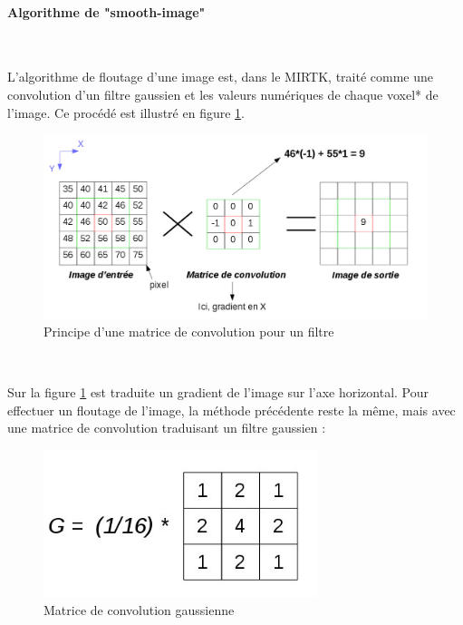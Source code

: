 \documentclass[10pt]{report}
\begin{document}
	\paragraph{Algorithme de "smooth-image"}
~\par
	L'algorithme de floutage d'une image est, dans le MIRTK, traité comme une convolution d'un filtre gaussien et les valeurs numériques de chaque voxel* de l'image. Ce procédé est illustré en figure \ref{Principe d'une matrice de convolution pour un filtre}.
	\begin{figure}[h!]
		\begin{center}
			\includegraphics[width=12cm]{convolve.jpg}
		\end{center}
		\caption{Principe d'une matrice de convolution pour un filtre}
		\label{Principe d'une matrice de convolution pour un filtre}
	\end{figure} ~\par
	Sur la figure \ref{Principe d'une matrice de convolution pour un filtre} est traduite un gradient de l'image sur l'axe horizontal. Pour effectuer un floutage de l'image, la méthode précédente reste la même, mais avec une matrice de convolution traduisant un filtre gaussien :
	\begin{figure}[h!]
		\begin{center}
			\includegraphics[width=8cm]{matrix_gaussian.jpg}
		\end{center}
		\caption{Matrice de convolution gaussienne}
		\label{Matrice de convolution gaussienne}
	\end{figure} ~\par
\end{document}
